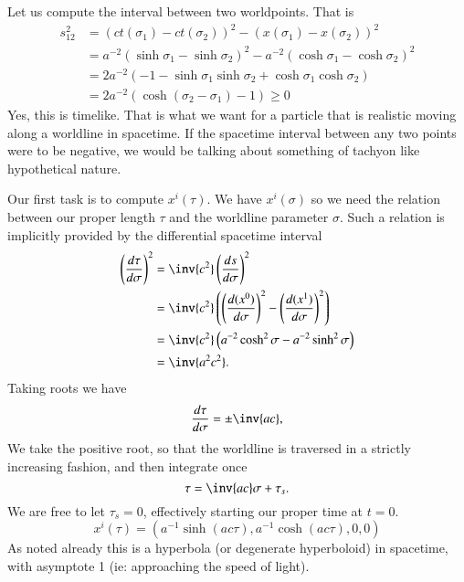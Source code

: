 {Let us compute the interval between two worldpoints.  That is
%
\begin{equation}\label{eqn:relativisticElectrodynamicsT2:2100}
\begin{aligned}
s_{12}^2
&= (ct(\sigma_1) - ct(\sigma_2))^2 - (x(\sigma_1) - x(\sigma_2))^2  \\
&= a^{-2} (\sinh \sigma_1 - \sinh \sigma_2)^2 - a^{-2} (\cosh\sigma_1 - \cosh\sigma_2)^2 \\
&= 2 a^{-2} \left( -1 - \sinh\sigma_1 \sinh \sigma_2 + \cosh\sigma_1 \cosh\sigma_2 \right) \\
&= 2 a^{-2} \left( \cosh( \sigma_2 - \sigma_1) -1 \right) \ge 0
\end{aligned}
\end{equation}
%
Yes, this is timelike.  That is what we want for a particle that is realistic moving along a worldline in spacetime.  If the spacetime interval between any two points were to be negative, we would be talking about something of tachyon like hypothetical nature.

%
%
Our first task is to compute \(x^i(\tau)\).  We have \(x^i(\sigma)\) so we need the relation between our proper length \(\tau\) and the worldline parameter \(\sigma\).  Such a relation is implicitly provided by the differential spacetime interval
%
\begin{equation}\label{eqn:relativisticElectrodynamicsT2:2120}
\begin{aligned}
\left(\frac{d\tau}{d\sigma}\right)^2
&= \inv{c^2} \left(\frac{ds}{d\sigma}\right)^2 \\
&= \inv{c^2} \left(
\left( \frac{d(x^0)}{d\sigma}\right)^2
-\left( \frac{d(x^1)}{d\sigma}\right)^2
\right) \\
&= \inv{c^2} \left( a^{-2} \cosh^2 \sigma - a^{-2} \sinh^2 \sigma \right) \\
&= \inv{a^2 c^2}.
\end{aligned}
\end{equation}
Taking roots we have
\begin{equation}\label{eqn:relativisticElectrodynamicsT2:50}
\frac{d\tau}{d\sigma} = \pm \inv{a c},
\end{equation}
%
We take the positive root, so that the worldline is traversed in a strictly increasing fashion, and then integrate once
%
\begin{equation}\label{eqn:relativisticElectrodynamicsT2:60}
\tau = \inv{ac} \sigma + \tau_s.
\end{equation}
%
We are free to let \(\tau_s = 0\), effectively starting our proper time at \(t=0\).
%
\begin{equation}\label{eqn:relativisticElectrodynamicsT2:70}
x^i(\tau) = ( a^{-1} \sinh( a c \tau), a^{-1} \cosh( a c \tau ), 0, 0 )
\end{equation}
%
As noted already this is a hyperbola (or degenerate hyperboloid) in spacetime, with asymptote 1 (ie: approaching the speed of light).

}
